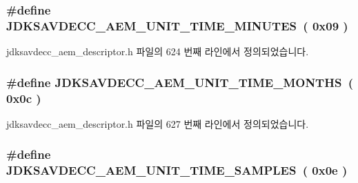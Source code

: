 \subsubsection[{\texorpdfstring{J\+D\+K\+S\+A\+V\+D\+E\+C\+C\+\_\+\+A\+E\+M\+\_\+\+U\+N\+I\+T\+\_\+\+T\+I\+M\+E\+\_\+\+M\+I\+N\+U\+T\+ES}{JDKSAVDECC_AEM_UNIT_TIME_MINUTES}}]{\setlength{\rightskip}{0pt plus 5cm}\#define J\+D\+K\+S\+A\+V\+D\+E\+C\+C\+\_\+\+A\+E\+M\+\_\+\+U\+N\+I\+T\+\_\+\+T\+I\+M\+E\+\_\+\+M\+I\+N\+U\+T\+ES~( 0x09 )}\hypertarget{group__units_gae25d560b48713a0519c1d67ff1c2252f}{}\label{group__units_gae25d560b48713a0519c1d67ff1c2252f}


jdksavdecc\+\_\+aem\+\_\+descriptor.\+h 파일의 624 번째 라인에서 정의되었습니다.

\subsubsection[{\texorpdfstring{J\+D\+K\+S\+A\+V\+D\+E\+C\+C\+\_\+\+A\+E\+M\+\_\+\+U\+N\+I\+T\+\_\+\+T\+I\+M\+E\+\_\+\+M\+O\+N\+T\+HS}{JDKSAVDECC_AEM_UNIT_TIME_MONTHS}}]{\setlength{\rightskip}{0pt plus 5cm}\#define J\+D\+K\+S\+A\+V\+D\+E\+C\+C\+\_\+\+A\+E\+M\+\_\+\+U\+N\+I\+T\+\_\+\+T\+I\+M\+E\+\_\+\+M\+O\+N\+T\+HS~( 0x0c )}\hypertarget{group__units_gafe63a3464bd987cd6f14e90c285b2f52}{}\label{group__units_gafe63a3464bd987cd6f14e90c285b2f52}


jdksavdecc\+\_\+aem\+\_\+descriptor.\+h 파일의 627 번째 라인에서 정의되었습니다.

\subsubsection[{\texorpdfstring{J\+D\+K\+S\+A\+V\+D\+E\+C\+C\+\_\+\+A\+E\+M\+\_\+\+U\+N\+I\+T\+\_\+\+T\+I\+M\+E\+\_\+\+S\+A\+M\+P\+L\+ES}{JDKSAVDECC_AEM_UNIT_TIME_SAMPLES}}]{\setlength{\rightskip}{0pt plus 5cm}\#define J\+D\+K\+S\+A\+V\+D\+E\+C\+C\+\_\+\+A\+E\+M\+\_\+\+U\+N\+I\+T\+\_\+\+T\+I\+M\+E\+\_\+\+S\+A\+M\+P\+L\+ES~( 0x0e )}\hypertarget{group__units_ga51387cf4ae2488d7e733e2b631892ad3}{}\label{group__units_ga51387cf4ae2488d7e733e2b631892ad3}


